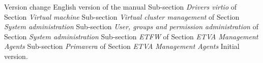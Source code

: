 \documentclass[12pt,a4paper,english]{scrreprt}
\begin{document}
\begin{Log}
Version change
English version of the manual
Sub-section \textit{Drivers virtio} of Section \textit{Virtual machine}
Sub-section \textit{Virtual cluster management} of Section \textit{System administration}
Sub-section \textit{User, groups and permission administration} of Section \textit{System administration}
Sub-section \textit{ETFW} of Section \textit{ETVA Management Agents}
Sub-section \textit{Primavera} of Section \textit{ETVA Management Agents}
Initial version.
\end{Log}

\tableofcontents

\listoffigures


%
%


%


\end{document}
